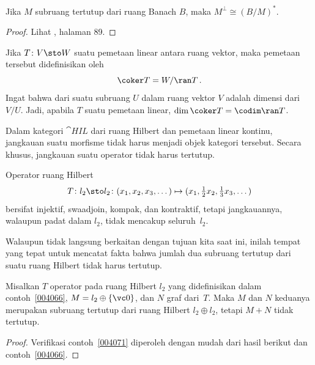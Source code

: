 \begin{prop} Jika $M$ subruang tertutup dari ruang Banach $B$, maka $M^\perp \cong (B/M)^*$.
\end{prop}

\begin{proof} Lihat \cite{Conway:1990}, halaman 89. \ns \end{proof}

\begin{defn} Jika $T\colon V \sto W$ suatu pemetaan linear antara ruang vektor, maka
 pemetaan tersebut didefinisikan oleh
  \[ \coker T = W/ \ran T\,. \]
Ingat bahwa
 dari suatu subruang $U$ dalam ruang vektor $V$ adalah dimensi dari~$V/U$. Jadi,
apabila $T$ suatu pemetaan linear, $\dim\coker T = \codim\ran T$.
\end{defn}

Dalam kategori $\cat{HIL}$ dari ruang Hilbert dan pemetaan linear kontinu, jangkauan suatu
morfisme tidak harus menjadi objek kategori tersebut. Secara khusus, jangkauan suatu operator
tidak harus tertutup.

\begin{exam}\label{004066} Operator ruang Hilbert
   \[ T\colon l_2 \sto l_2\colon (x_1,x_2,x_3,\dots) \mapsto
                                   (x_1, \tfrac12 x_2, \tfrac13 x_3, \dots) \]
bersifat injektif, swaadjoin, kompak, dan kontraktif,
tetapi jangkauannya, walaupun padat dalam $l_2$, tidak mencakup seluruh~$l_2$.
\end{exam}

Walaupun tidak langsung berkaitan dengan tujuan kita saat ini, inilah tempat yang tepat untuk mencatat
fakta bahwa jumlah dua subruang tertutup dari suatu ruang Hilbert tidak harus tertutup.

\begin{exam}\label{004071} Misalkan $T$ operator pada ruang Hilbert $l_2$ yang didefinisikan dalam
contoh~\ref{004066}, $M = l_2 \oplus \{\vc 0\}$, dan $N$ graf dari~$T$. Maka $M$
dan $N$ keduanya merupakan subruang tertutup dari ruang Hilbert $l_2 \oplus l_2$, tetapi $M + N$
tidak tertutup.
\end{exam}

\begin{proof} Verifikasi contoh~\ref{004071} diperoleh dengan mudah dari hasil berikut
dan contoh~\ref{004066}. \ns
\end{proof}

